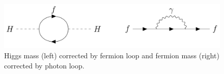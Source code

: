 \begin{figure}[hbtp]
\centering
\includegraphics[scale=0.3]{figures/intro/loop_diagrams.png}
\caption{Higgs mass (left) corrected by fermion loop and fermion mass (right) corrected by photon loop.}
\label{loop_diagrams}
\end{figure}